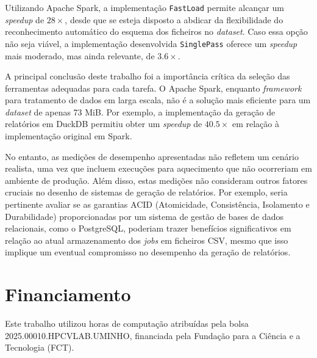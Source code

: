 \documentclass[11pt, a4paper]{article}
\begin{document}
Utilizando Apache Spark, a implementação \texttt{FastLoad} permite alcançar um \emph{speedup} de
$28\times$, desde que se esteja disposto a abdicar da flexibilidade do reconhecimento automático do
esquema dos ficheiros no \emph{dataset}. Caso essa opção não seja viável, a implementação
desenvolvida \texttt{SinglePass} oferece um \emph{speedup} mais moderado, mas ainda relevante, de
$3.6\times$.

A principal conclusão deste trabalho foi a importância crítica da seleção das ferramentas adequadas
para cada tarefa. O Apache Spark, enquanto \emph{framework} para tratamento de dados em larga
escala, não é a solução mais eficiente para um \emph{dataset} de apenas 73 MiB. Por exemplo, a
implementação da geração de relatórios em DuckDB permitiu obter um \emph{speedup} de $40.5\times$ em
relação à implementação original em Spark.

No entanto, as medições de desempenho apresentadas não refletem um cenário realista, uma vez que
incluem execuções para aquecimento que não ocorreriam em ambiente de produção. Além disso, estas
medições não consideram outros fatores cruciais no desenho de sistemas de geração de relatórios.
Por exemplo, seria pertinente avaliar se as garantias ACID (Atomicidade, Consistência, Isolamento e
Durabilidade) proporcionadas por um sistema de gestão de bases de dados relacionais, como o
PostgreSQL, poderiam trazer benefícios significativos em relação ao atual armazenamento dos
\emph{jobs} em ficheiros CSV, mesmo que isso implique um eventual compromisso no desempenho da
geração de relatórios.

\section*{Financiamento} %

Este trabalho utilizou horas de computação atribuídas pela bolsa 2025.00010.HPCVLAB.UMINHO,
financiada pela Fundação para a Ciência e a Tecnologia (FCT).
\end{document}
